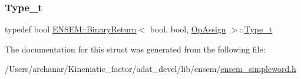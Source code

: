 \mbox{\label{structENSEM_1_1BinaryReturn_3_01bool_00_01bool_00_01OpAssign_01_4_a5520ece3a7087e94fe3d252e1d2ab29f}} 
\subsubsection{\texorpdfstring{Type\_t}{Type\_t}\hspace{0.1cm}{\footnotesize\ttfamily [2/2]}}
{\footnotesize\ttfamily typedef bool \mbox{\hyperlink{structENSEM_1_1BinaryReturn}{E\+N\+S\+E\+M\+::\+Binary\+Return}}$<$ bool, bool, \mbox{\hyperlink{structENSEM_1_1OpAssign}{Op\+Assign}} $>$\+::\mbox{\hyperlink{structENSEM_1_1BinaryReturn_3_01bool_00_01bool_00_01OpAssign_01_4_a5520ece3a7087e94fe3d252e1d2ab29f}{Type\+\_\+t}}}



The documentation for this struct was generated from the following file\+:\begin{DoxyCompactItemize}
\item 
/\+Users/archanar/\+Kinematic\+\_\+factor/adat\+\_\+devel/lib/ensem/\mbox{\hyperlink{lib_2ensem_2ensem__simpleword_8h}{ensem\+\_\+simpleword.\+h}}\end{DoxyCompactItemize}
